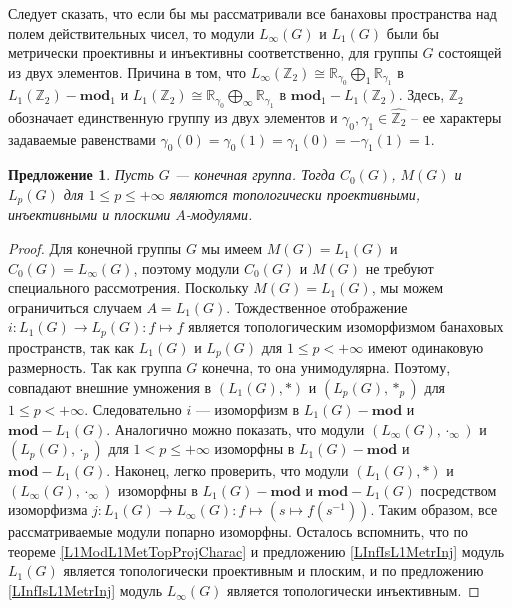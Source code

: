 \documentclass{article}
\numberwithin{equation}{section}
\theoremstyle{plain}
\newtheorem{propos}{Предложение}
\theoremstyle{definition}
\newtheorem{proof}{Доказательство}\def\theproof{}
\newcommand{\convol}{\ast}
\newcommand{\isom}{\mathop{\mathbin{\cong}}}
\begin{document}
\begin{fulltext}
Следует сказать, что если бы мы рассматривали все банаховы пространства 
над полем действительных чисел, то модули $L_\infty(G)$ и $L_1(G)$ 
были бы метрически проективны и инъективны соответственно, для группы $G$ 
состоящей из двух элементов. Причина в том, что $L_\infty(\mathbb{Z}_2)\isom \mathbb{R}_{\gamma_0}\bigoplus\nolimits_1\mathbb{R}_{\gamma_1}$ в 
$L_1(\mathbb{Z}_2)-\mathbf{mod}_1$ и $L_1(\mathbb{Z}_2)\isom \mathbb{R}_{\gamma_0}\bigoplus\nolimits_\infty\mathbb{R}_{\gamma_1}$ в 
$\mathbf{mod}_1-L_1(\mathbb{Z}_2)$. Здесь, $\mathbb{Z}_2$ обозначает 
единственную группу из двух элементов и 
$\gamma_0,\gamma_1\in\widehat{\mathbb{Z}_2}$ -- ее характеры задаваемые 
равенствами $\gamma_0(0)=\gamma_0(1)=\gamma_1(0)=-\gamma_1(1)=1$.

\begin{propos}\label{StdModFinGrL1MGTopInjProjFlatCharac} Пусть $G$ --- конечная группа. 
Тогда $C_0(G)$, $M(G)$ и $L_p(G)$ для $1\leq p\leq +\infty$ являются топологически 
проективными, инъективными и плоскими $A$-модулями.
\end{propos} 
\begin{proof}
Для конечной группы $G$ мы имеем $M(G)=L_1(G)$ и $C_0(G)=L_\infty(G)$, поэтому 
модули $C_0(G)$ и $M(G)$ не требуют специального рассмотрения. Поскольку 
$M(G)=L_1(G)$, мы можем ограничиться случаем $A=L_1(G)$. Тождественное 
отображение $i:L_1(G)\to L_p(G):f\mapsto f$ является топологическим 
изоморфизмом банаховых пространств, так как $L_1(G)$ и $L_p(G)$ для 
$1\leq p<+\infty$ имеют одинаковую размерность. Так как группа $G$ конечна, 
то она унимодулярна. Поэтому, совпадают внешние умножения в 
$(L_1(G),\convol)$ и $(L_p(G),\convol_p)$ для $1\leq p<+\infty$. 
Следовательно $i$ --- изоморфизм в $L_1(G)-\mathbf{mod}$ и 
$\mathbf{mod}-L_1(G)$. Аналогично можно показать, что модули 
$(L_\infty(G),\cdot_\infty)$ и $(L_p(G),\cdot_p)$ для 
$1<p\leq+\infty$ изоморфны в $L_1(G)-\mathbf{mod}$ и 
$\mathbf{mod}-L_1(G)$. Наконец, легко проверить, что модули 
$(L_1(G),\convol)$ и $(L_\infty(G),\cdot_\infty)$ изоморфны в 
$L_1(G)-\mathbf{mod}$ и $\mathbf{mod}-L_1(G)$ посредством изоморфизма 
$j:L_1(G)\to L_\infty(G):f\mapsto(s\mapsto f(s^{-1}))$. Таким образом, 
все рассматриваемые модули попарно изоморфны. Осталось вспомнить, что по 
теореме \ref{L1ModL1MetTopProjCharac} и предложению 
\ref{LInfIsL1MetrInj} модуль $L_1(G)$ является топологически проективным 
и плоским, и  по предложению \ref{LInfIsL1MetrInj} модуль  $L_\infty(G)$ 
является топологически инъективным.
\end{proof}


\end{fulltext}
\end{document}
